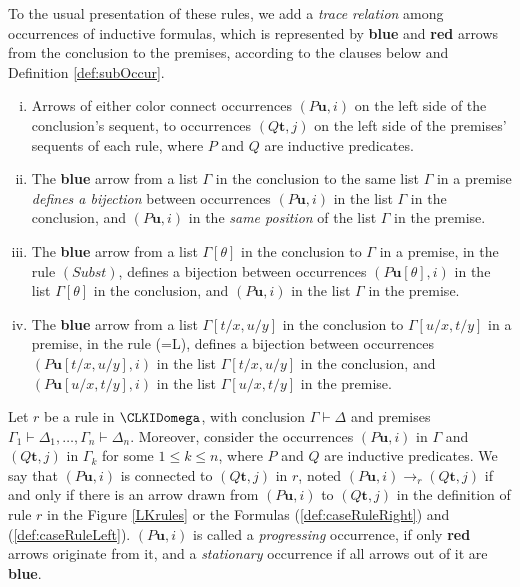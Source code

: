 To the usual presentation of these rules, we add a \emph{trace relation} among occurrences of inductive formulas, which is represented by {\color{blue} \bf blue} and {\color{red} \bf red} arrows from the conclusion to the premises, according to the clauses below and Definition \ref{def:subOccur}. 


\begin{enumerate}[i)]
    \item Arrows of either color connect occurrences $(P\mathbf{u}, i)$ on the left side of the conclusion's sequent, to occurrences $(Q\mathbf{t}, j)$ on the left side of the premises' sequents of each rule, where $P$ and $Q$ are inductive predicates.
    \item The {\color{blue} \bf blue} arrow from a list $\Gamma$ in the conclusion to the same list $\Gamma$ in a premise \emph{defines a bijection} between occurrences $(P\mathbf{u},i)$ in the list $\Gamma$ in the conclusion, and $(P\mathbf{u},i)$ in the \emph{same position} of the list $\Gamma$ in the premise.
    \item The {\color{blue} \bf blue} arrow from a list $\Gamma[\theta]$ in the conclusion to $\Gamma$ in a premise, in the rule $(Subst)$, defines a bijection between occurrences $(P\mathbf{u}[\theta],i)$ in the list $\Gamma[\theta]$ in the conclusion, and $(P\mathbf{u},i)$ in the list $\Gamma$ in the premise.
    \item The {\color{blue} \bf blue} arrow from a list $\Gamma[t/x,u/y]$ in the conclusion to $\Gamma[u/x,t/y]$ in a premise, in the rule (=L), defines a bijection between occurrences $(P\mathbf{u}[t/x,u/y],i)$ in the list $\Gamma[t/x,u/y]$ in the conclusion, and $(P\mathbf{u}[u/x,t/y],i)$ in the list $\Gamma[u/x,t/y]$ in the premise.   
\end{enumerate}


\begin{definition}
    \label{def:subOccur}
    Let $r$ be a rule in $\CLKIDomega$, with conclusion $\Gamma \vdash \Delta$ and premises $\Gamma_1 \vdash \Delta_1, \ldots, \Gamma_n \vdash \Delta_n$. Moreover, consider the occurrences $(P\mathbf{u},i)$ in $\Gamma$ and $(Q\mathbf{t},j)$ in $\Gamma_k$ for some $ 1 \leq k \leq n$, where $P$ and $Q$ are inductive predicates. We say that $(P\mathbf{u},i)$ is connected to $(Q\mathbf{t},j)$ in $r$, noted $(P\mathbf{u},i) \rightarrow_{r} (Q\mathbf{t},j)$ if and only if there is an arrow drawn from $(P\mathbf{u},i)$ to $(Q\mathbf{t},j)$ in the definition of rule $r$ in the Figure \ref{LKrules} or the Formulas (\ref{def:caseRuleRight}) and (\ref{def:caseRuleLeft}). $(P\mathbf{u},i)$ is called a \emph{progressing} occurrence, if only {\color{red} \bf red} arrows originate from it, and a \emph{stationary} occurrence if all arrows out of it are {\color{blue} \bf blue}.
\end{definition}

